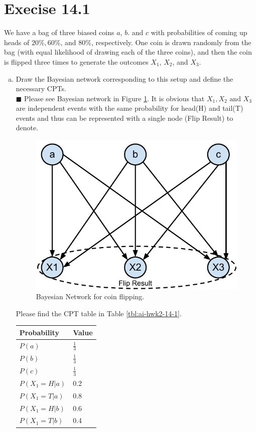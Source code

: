 \documentclass{article}
\newcommand{\solution}[1]{~\\ $\blacksquare$ \sffamily\upshape\selectfont #1
\normalfont ~\\~ }
\begin{document}
\section{Execise 14.1}
We have a bag of three biased coins $a$, $b$. and $c$ with
probabilities of coming up heads of $20\%, 60\%$, and $80\%$,
respectively. One coin is drawn randomly from the bag (with equal
likelihood of drawing each of the three coins), and then the coin is
flipped three times to generate the outcomes $X_1$, $X_2$, and $X_3$.
\begin{enumerate}[a.]
\item Draw the Bayesian network corresponding to this setup and define
  the necessary CPTs. 
  \solution{
    Please see Bayesian network in Figure \ref{fig:14_1}. It is
    obvious that $X_1,X_2 \mbox{ and } X_3$ are independent events
    with the same probability for head(H) and tail(T) events and thus
    can be represented with a single node (Flip Result) to denote. 
    \begin{figure}[ht]
      \centering
      \includegraphics[width=.5\textwidth]{AI-HWK-2_14_1.pdf}
      \caption{Bayesian Network for coin flipping.}\label{fig:14_1}
    \end{figure}
    Please find the CPT table in Table \ref{tbl:ai-hwk2-14-1}.
  \begin{table}[h]
    \centering
    \begin{tabular}{l|l}
      \toprule
      \textbf{Probability} & \textbf{Value} \\ \toprule
      $P(a)$ & $\frac{1}{3}$ \\ \midrule
      $P(b)$ & $\frac{1}{3}$ \\ \midrule
      $P(c)$ & $\frac{1}{3}$ \\ \midrule
      $P(X_1=H|a)$ & 0.2 \\ \midrule
      $P(X_1=T|a)$ & 0.8 \\ \midrule
      $P(X_1=H|b)$ & 0.6 \\ \midrule
      $P(X_1=T|b)$ & 0.4 \\ \midrule 

\end{tabular}
\end{table}}
\end{enumerate}
\end{document}
